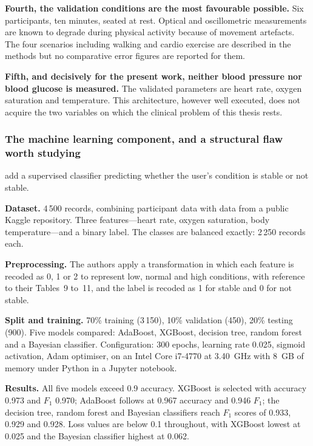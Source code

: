 \documentclass[12pt,a4paper,oneside]{report}
\begin{document}
\textbf{Fourth, the validation conditions are the most favourable possible.} Six participants, ten minutes, seated at rest. Optical and oscillometric measurements are known to degrade during physical activity because of movement artefacts. The four scenarios including walking and cardio exercise are described in the methods but no comparative error figures are reported for them.

\textbf{Fifth, and decisively for the present work, neither blood pressure nor blood glucose is measured.} The validated parameters are heart rate, oxygen saturation and temperature. This architecture, however well executed, does not acquire the two variables on which the clinical problem of this thesis rests.

\subsubsection{The machine learning component, and a structural flaw worth studying}\label{sec:leakage}

\Textcite{efendi2025} add a supervised classifier predicting whether the user's condition is stable or not stable.

\textbf{Dataset.} 4\,500 records, combining participant data with data from a public Kaggle repository. Three features---heart rate, oxygen saturation, body temperature---and a binary label. The classes are balanced exactly: 2\,250 records each.

\textbf{Preprocessing.} The authors apply a transformation in which each feature is recoded as 0, 1 or 2 to represent low, normal and high conditions, with reference to their Tables~9 to~11, and the label is recoded as 1 for stable and 0 for not stable.

\textbf{Split and training.} 70\% training (3\,150), 10\% validation (450), 20\% testing (900). Five models compared: AdaBoost, XGBoost, decision tree, random forest and a Bayesian classifier. Configuration: 300 epochs, learning rate 0.025, sigmoid activation, Adam optimiser, on an Intel Core i7-4770 at 3.40~GHz with 8~GB of memory under Python in a Jupyter notebook.

\textbf{Results.} All five models exceed 0.9 accuracy. XGBoost is selected with accuracy 0.973 and $F_1$ 0.970; AdaBoost follows at 0.967 accuracy and 0.946 $F_1$; the decision tree, random forest and Bayesian classifiers reach $F_1$ scores of 0.933, 0.929 and 0.928. Loss values are below 0.1 throughout, with XGBoost lowest at 0.025 and the Bayesian classifier highest at 0.062.
\end{document}
